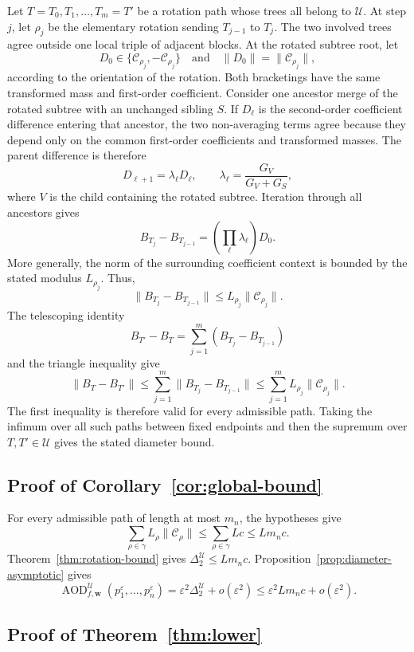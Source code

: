 \documentclass[11pt]{article}
\theoremstyle{plain}
\theoremstyle{definition}
\theoremstyle{definition}
\newcommand{\AOD}{\operatorname{AOD}}
\newcommand{\eps}{\varepsilon}
\newcommand{\Curv}{\mathcal C}
\newcommand{\wv}{\mathbf w}
\newcommand{\AODfw}{\AOD_{f,\wv}}
\begin{document}
Let $T=T_0,T_1,\ldots,T_m=T'$ be a rotation path whose trees all belong to $\mathcal U$. At step $j$, let $\rho_j$ be the elementary rotation sending $T_{j-1}$ to $T_j$. The two involved trees agree outside one local triple of adjacent blocks. At the rotated subtree root, let
\[D_0\in\{\Curv_{\rho_j},-\Curv_{\rho_j}\}\quad\text{and}\quad
\|D_0\|=\|\Curv_{\rho_j}\|,\]
according to the orientation of the rotation.
Both bracketings have the same transformed mass and first-order coefficient. Consider one ancestor merge of the rotated subtree with an unchanged sibling $S$. If $D_\ell$ is the second-order coefficient difference entering that ancestor, the two non-averaging terms agree because they depend only on the common first-order coefficients and transformed masses. The parent difference is therefore
\[
D_{\ell+1}
=\lambda_\ell D_\ell,
\qquad
\lambda_\ell=\frac{G_V}{G_V+G_S},
\]
where $V$ is the child containing the rotated subtree. Iteration through all ancestors gives
\[
B_{T_j}-B_{T_{j-1}}
=\left(\prod_{\ell}\lambda_\ell\right)D_0.
\]
More generally, the norm of the surrounding coefficient context is bounded by the stated modulus $L_{\rho_j}$. Thus,
\[
\|B_{T_j}-B_{T_{j-1}}\|\le L_{\rho_j}\|\Curv_{\rho_j}\|.
\]
The telescoping identity
\[
B_{T'}-B_T=\sum_{j=1}^m(B_{T_j}-B_{T_{j-1}})
\]
and the triangle inequality give
\[
\|B_T-B_{T'}\|\le \sum_{j=1}^m\|B_{T_j}-B_{T_{j-1}}\|
\le \sum_{j=1}^mL_{\rho_j}\|\Curv_{\rho_j}\|.
\]
The first inequality is therefore valid for every admissible path. Taking the infimum over all such paths between fixed endpoints and then the supremum over $T,T'\in\mathcal U$ gives the stated diameter bound.

\subsection{Proof of Corollary~\ref{cor:global-bound}}

For every admissible path of length at most $m_n$, the hypotheses give
\[
\sum_{\rho\in\gamma}L_\rho\|\Curv_\rho\|
\le \sum_{\rho\in\gamma}Lc
\le Lm_nc.
\]
Theorem~\ref{thm:rotation-bound} gives $\Delta_2^{\mathcal U}\le Lm_nc$. Proposition~\ref{prop:diameter-asymptotic} gives
\[
\AODfw^{\mathcal U}(p_1^\eps,\ldots,p_n^\eps)=\eps^2\Delta_2^{\mathcal U}+o(\eps^2)
\le \eps^2Lm_nc+o(\eps^2).
\]

\subsection{Proof of Theorem~\ref{thm:lower}}
\end{document}
